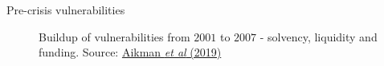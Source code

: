 \begin{frame}{Pre-crisis vulnerabilities}

\begin{figure}
\begin{center}


\caption{\label{fig:L4_aikman_et_al_banks_bs_pre_crisis} Buildup of vulnerabilities from $2001$ to $2007$ - solvency, liquidity and funding. Source: \href{https://pubs.aeaweb.org/doi/pdfplus/10.1257/jep.33.1.107}{Aikman \emph{et al} (2019)}}

\end{center}
\end{figure}


\end{frame}

